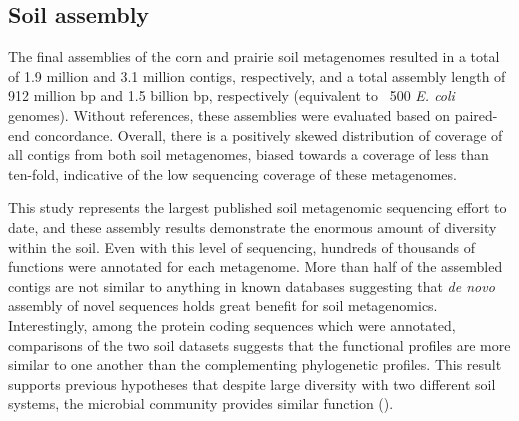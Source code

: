 \documentclass[11pt]{article} %
\begin{document}
\subsection{Soil assembly}
The final assemblies of the corn and prairie soil metagenomes resulted
in a total of 1.9 million and 3.1 million contigs, respectively, and a
total assembly length of 912 million bp and 1.5 billion bp,
respectively (equivalent to ~500 \emph{E. coli} genomes).  Without references, these
assemblies were evaluated based on paired-end concordance.  Overall,
there is a positively skewed distribution of coverage of all contigs
from both soil metagenomes, biased towards a coverage of less than
ten-fold, indicative of the low sequencing coverage of these
metagenomes.


This study represents the largest published soil metagenomic sequencing effort
to date, and these assembly results demonstrate the enormous amount of
diversity within the soil.  Even with this level of sequencing,
hundreds of thousands of functions were annotated for each metagenome.
More than half of the assembled contigs are not similar to anything in
known databases suggesting that {\em de novo} assembly of novel sequences
holds great benefit for soil metagenomics.  Interestingly, among the
protein coding sequences which were annotated, comparisons of the two
soil datasets suggests that the functional profiles are more similar
to one another than the complementing phylogenetic profiles.  This
result supports previous hypotheses that despite large diversity with
two different soil systems, the microbial community provides similar
function (\cite{Girvan:2005jv,McGradySteed:1997uj,Muller:2002cd,Konstantinidis:2004hr}).
\end{document}

